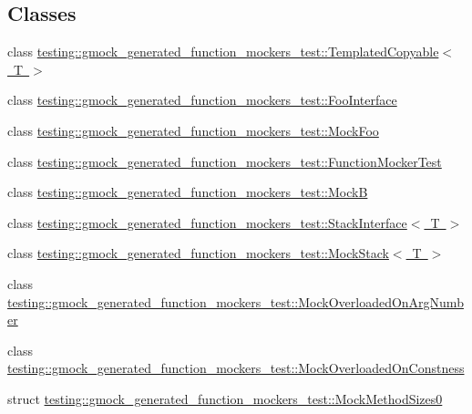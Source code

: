 \subsection*{Classes}
\begin{DoxyCompactItemize}
\item 
class \mbox{\hyperlink{classtesting_1_1gmock__generated__function__mockers__test_1_1_templated_copyable}{testing\+::gmock\+\_\+generated\+\_\+function\+\_\+mockers\+\_\+test\+::\+Templated\+Copyable$<$ T $>$}}
\item 
class \mbox{\hyperlink{classtesting_1_1gmock__generated__function__mockers__test_1_1_foo_interface}{testing\+::gmock\+\_\+generated\+\_\+function\+\_\+mockers\+\_\+test\+::\+Foo\+Interface}}
\item 
class \mbox{\hyperlink{classtesting_1_1gmock__generated__function__mockers__test_1_1_mock_foo}{testing\+::gmock\+\_\+generated\+\_\+function\+\_\+mockers\+\_\+test\+::\+Mock\+Foo}}
\item 
class \mbox{\hyperlink{classtesting_1_1gmock__generated__function__mockers__test_1_1_function_mocker_test}{testing\+::gmock\+\_\+generated\+\_\+function\+\_\+mockers\+\_\+test\+::\+Function\+Mocker\+Test}}
\item 
class \mbox{\hyperlink{classtesting_1_1gmock__generated__function__mockers__test_1_1_mock_b}{testing\+::gmock\+\_\+generated\+\_\+function\+\_\+mockers\+\_\+test\+::\+MockB}}
\item 
class \mbox{\hyperlink{classtesting_1_1gmock__generated__function__mockers__test_1_1_stack_interface}{testing\+::gmock\+\_\+generated\+\_\+function\+\_\+mockers\+\_\+test\+::\+Stack\+Interface$<$ T $>$}}
\item 
class \mbox{\hyperlink{classtesting_1_1gmock__generated__function__mockers__test_1_1_mock_stack}{testing\+::gmock\+\_\+generated\+\_\+function\+\_\+mockers\+\_\+test\+::\+Mock\+Stack$<$ T $>$}}
\item 
class \mbox{\hyperlink{classtesting_1_1gmock__generated__function__mockers__test_1_1_mock_overloaded_on_arg_number}{testing\+::gmock\+\_\+generated\+\_\+function\+\_\+mockers\+\_\+test\+::\+Mock\+Overloaded\+On\+Arg\+Number}}
\item 
class \mbox{\hyperlink{classtesting_1_1gmock__generated__function__mockers__test_1_1_mock_overloaded_on_constness}{testing\+::gmock\+\_\+generated\+\_\+function\+\_\+mockers\+\_\+test\+::\+Mock\+Overloaded\+On\+Constness}}
\item 
struct \mbox{\hyperlink{structtesting_1_1gmock__generated__function__mockers__test_1_1_mock_method_sizes0}{testing\+::gmock\+\_\+generated\+\_\+function\+\_\+mockers\+\_\+test\+::\+Mock\+Method\+Sizes0}}

\end{DoxyCompactItemize}
